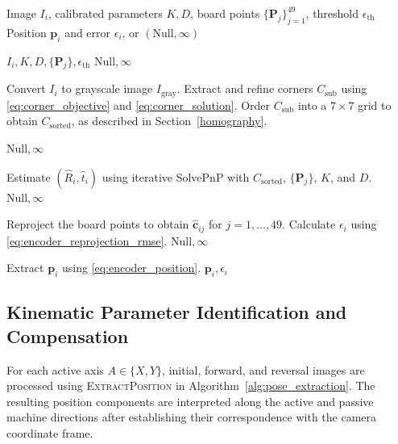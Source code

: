\documentclass[journal]{IEEEtran}
\begin{document}
\begin{algorithm}[!t]
\caption{\textsc{ExtractPosition} Function}
\label{alg:pose_extraction}
\begin{algorithmic}[1]
\footnotesize

\Require Image $I_i$, calibrated parameters $K,D$,
\Statex \hspace{2.5em}
board points $\{\mathbf P_j\}_{j=1}^{49}$,
threshold $\epsilon_{\mathrm{th}}$
\Ensure Position $\mathbf p_i$ and error $\epsilon_i$,
or $(\text{Null},\infty)$

{$I_i,K,D,\{\mathbf P_j\},\epsilon_{\mathrm{th}}$}
        \State \Return $\text{Null},\infty$
    \EndIf

    \State Convert $I_i$ to grayscale image
        $I_{\mathrm{gray}}$.
    \State Extract and refine corners $C_{\mathrm{sub}}$
        using \eqref{eq:corner_objective}
        and \eqref{eq:corner_solution}.
    \State Order $C_{\mathrm{sub}}$ into a $7\times7$
        grid to obtain $C_{\mathrm{sorted}}$,
        as described in Section~\ref{homography}.

        \State \Return $\text{Null},\infty$
    \EndIf

    \State Estimate $(\hat R_i,\hat t_i)$ using
        iterative SolvePnP with $C_{\mathrm{sorted}}$,
        $\{\mathbf P_j\}$, $K$, and $D$.
        \State \Return $\text{Null},\infty$
    \EndIf

    \State Reproject the board points to obtain
        $\hat{\mathbf c}_{ij}$ for $j=1,\ldots,49$.
    \State Calculate $\epsilon_i$ using
        \eqref{eq:encoder_reprojection_rmse}.
        \State \Return $\text{Null},\infty$
    \EndIf

    \State Extract $\mathbf p_i$ using
        \eqref{eq:encoder_position}.
    \State \Return $\mathbf p_i,\epsilon_i$
\EndFunction

\end{algorithmic}
\end{algorithm}

\subsection{Kinematic Parameter Identification and Compensation}

For each active axis $A\in\{X,Y\}$, initial, forward,
and reversal images are processed using
\textsc{ExtractPosition} in
Algorithm~\ref{alg:pose_extraction}.
The resulting position components are interpreted
along the active and passive machine directions
after establishing their correspondence with
the camera coordinate frame.
\end{document}

